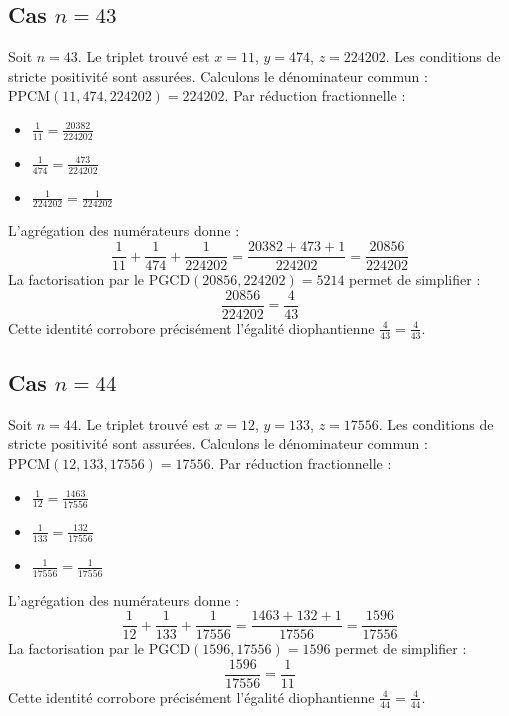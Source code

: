 \documentclass[11pt,a4paper]{article}
\begin{document}
\subsection{Cas $n = 43$}
Soit $n = 43$. Le triplet trouvé est $x = 11$, $y = 474$, $z = 224202$.
Les conditions de stricte positivité sont assurées.
Calculons le dénominateur commun : $\text{PPCM}(11, 474, 224202) = 224202$.
Par réduction fractionnelle :
\begin{itemize}
    \item $\frac{1}{11} = \frac{20382}{224202}$
    \item $\frac{1}{474} = \frac{473}{224202}$
    \item $\frac{1}{224202} = \frac{1}{224202}$
\end{itemize}
L'agrégation des numérateurs donne :
$$ \frac{1}{11} + \frac{1}{474} + \frac{1}{224202} = \frac{20382 + 473 + 1}{224202} = \frac{20856}{224202} $$
La factorisation par le $\text{PGCD}(20856, 224202) = 5214$ permet de simplifier :
$$ \frac{20856}{224202} = \frac{4}{43} $$
Cette identité corrobore précisément l'égalité diophantienne $\frac{4}{43} = \frac{4}{43}$.

\subsection{Cas $n = 44$}
Soit $n = 44$. Le triplet trouvé est $x = 12$, $y = 133$, $z = 17556$.
Les conditions de stricte positivité sont assurées.
Calculons le dénominateur commun : $\text{PPCM}(12, 133, 17556) = 17556$.
Par réduction fractionnelle :
\begin{itemize}
    \item $\frac{1}{12} = \frac{1463}{17556}$
    \item $\frac{1}{133} = \frac{132}{17556}$
    \item $\frac{1}{17556} = \frac{1}{17556}$
\end{itemize}
L'agrégation des numérateurs donne :
$$ \frac{1}{12} + \frac{1}{133} + \frac{1}{17556} = \frac{1463 + 132 + 1}{17556} = \frac{1596}{17556} $$
La factorisation par le $\text{PGCD}(1596, 17556) = 1596$ permet de simplifier :
$$ \frac{1596}{17556} = \frac{1}{11} $$
Cette identité corrobore précisément l'égalité diophantienne $\frac{4}{44} = \frac{4}{44}$.
\end{document}
